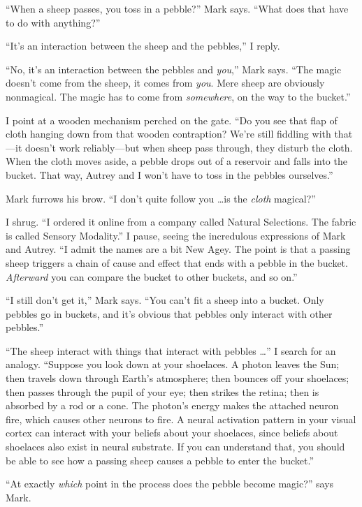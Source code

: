 {
 ``When a sheep passes, you toss in a
pebble?'' Mark says. ``What does
that have to do with anything?''}

{
 ``It's an interaction between the
sheep and the pebbles,'' I reply.}

{
 ``No, it's an interaction between
the pebbles and \textit{you},'' Mark says.
``The magic doesn't come from the
sheep, it comes from \textit{you}. Mere sheep are obviously nonmagical.
The magic has to come from \textit{somewhere}, on the way to the
bucket.''}

{
 I point at a wooden mechanism perched on the gate.
``Do you see that flap of cloth hanging down from that
wooden contraption? We're still fiddling with that---it
doesn't work reliably---but when sheep pass through,
they disturb the cloth. When the cloth moves aside, a pebble drops out
of a reservoir and falls into the bucket. That way, Autrey and I
won't have to toss in the pebbles
ourselves.''}

{
 Mark furrows his brow. ``I don't
quite follow you \ldots is the \textit{cloth}
magical?''}

{
 I shrug. ``I ordered it online from a company
called Natural Selections. The fabric is called Sensory
Modality.'' I pause, seeing the incredulous
expressions of Mark and Autrey. ``I admit the names
are a bit New Agey. The point is that a passing sheep triggers a chain
of cause and effect that ends with a pebble in the bucket.
\textit{Afterward} you can compare the bucket to other buckets, and so
on.''}

{
 ``I still don't get
it,'' Mark says. ``You
can't fit a sheep into a bucket. Only pebbles go in
buckets, and it's obvious that pebbles only interact
with other pebbles.''}

{
 ``The sheep interact with things that interact
with pebbles \ldots'' I search for an analogy.
``Suppose you look down at your shoelaces. A photon
leaves the Sun; then travels down through Earth's
atmosphere; then bounces off your shoelaces; then passes through the
pupil of your eye; then strikes the retina; then is absorbed by a rod
or a cone. The photon's energy makes the attached
neuron fire, which causes other neurons to fire. A neural activation
pattern in your visual cortex can interact with your beliefs about your
shoelaces, since beliefs about shoelaces also exist in neural
substrate. If you can understand that, you should be able to see how a
passing sheep causes a pebble to enter the bucket.''}

{
 ``At exactly \textit{which} point in the process
does the pebble become magic?'' says Mark.}

